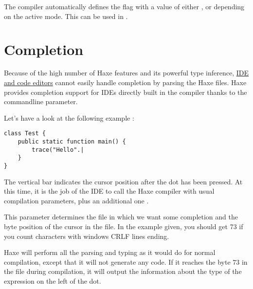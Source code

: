 The compiler automatically defines the flag  with a value of either ,  or  depending on the active mode. This can be used in .



\section{Completion}
\label{cr-completion}

Because of the high number of Haxe features and its powerful type inference, \href{http://haxe.org/documentation/introduction/editors-and-ides.html}{IDE and code editors} cannot easily handle completion by parsing the Haxe files. Haxe provides completion support for IDEs directly built in the compiler thanks to the  commandline parameter.

Let's have a look at the following example :
\begin{lstlisting}
class Test {
    public static function main() {
        trace("Hello".|
    }
}
\end{lstlisting}

The vertical bar indicates the cursor position after the dot has been pressed. At this time, it is the job of the IDE to call the Haxe compiler with usual compilation parameters, plus an additional one .

This parameter determines the file in which we want some completion and the byte position of the cursor in the file. In the example given, you should get 73 if you count characters with windows CRLF lines ending.


Haxe will perform all the parsing and typing as it would do for normal compilation, except that it will not generate any code. If it reaches the byte 73 in the file  during compilation, it will output the information about the type of the expression on the left of the dot.


